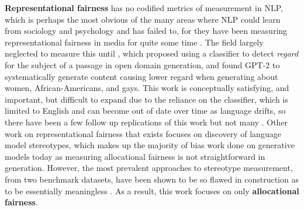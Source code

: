 \textbf{Representational fairness} has no codified metrics of measurement in NLP, which is perhaps the most obvious of the many areas where NLP could learn from sociology and psychology and has failed to, for they have been measuring representational fairness in media for quite some time \citep{}. The field largely neglected to measure this until \citet{sheng-etal-2019-woman}, which proposed using a classifier to detect \textit{regard} for the subject of a passage in open domain generation, and found GPT-2 to systematically generate content causing lower regard when generating about women, African-Americans, and gays. This work is conceptually satisfying, and important, but difficult to expand due to the reliance on the classifier, which is limited to English and can become out of date over time as language drifts, so there have been a few follow up replications of this work but not many \citep{goldfarb-tarrant-etal-2023-prompt}. Other work on representational fairness that exists focuses on discovery of language model stereotypes, which makes up the majority of bias work done on generative models today \citep{goldfarb-tarrant-etal-2023-prompt} as measuring allocational fairness is not straightforward in generation. However, the most prevalent approaches to stereotype measurement, from two benchmark datasets, have been shown to be so flawed in construction as to be essentially meaningless \citep{blodgett-etal-2021-stereotyping}. As a result, this work focuses on only \textbf{allocational fairness}.

